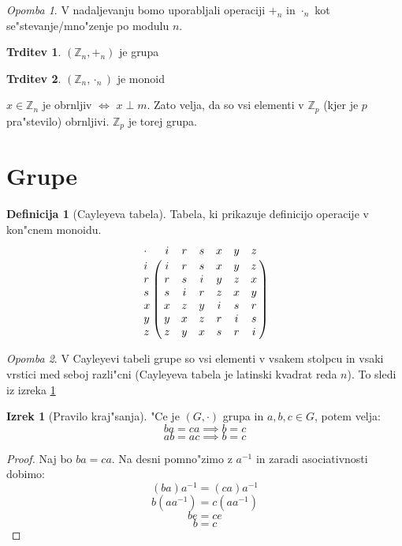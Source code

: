 \documentclass{article}
\theoremstyle{definition}
\newtheorem{definition}{Definicija}[section]
\newtheorem{claim}{Trditev}[section]
\newtheorem{theorem}{Izrek}[section]
\theoremstyle{remark}
\newtheorem*{rem}{Opomba}
\newcommand{\Z}{\mathbb{Z}}
\let\bbordermatrix\bordermatrix
\begin{document}
	\begin{rem}
		V nadaljevanju bomo uporabljali operaciji $+_{n}$ in $\cdot_{n}$ kot se"stevanje/mno"zenje po modulu $n$.
	\end{rem}
	
	\begin{claim}
		$(\Z_n, +_n)$ je grupa
	\end{claim}
	\begin{claim}
		$(\Z_n, \cdot_n)$ je monoid
	\end{claim}
	$x \in \Z_n$ je obrnljiv $\iff$ $x \perp m$. Zato velja, da so vsi elementi v $\Z_p$ (kjer je $p$ pra"stevilo) obrnljivi. $\Z_p$ je torej grupa.
	
	\section{Grupe}
	\begin{definition}[Cayleyeva tabela]
		Tabela, ki prikazuje definicijo operacije v kon"cnem monoidu.
		$$
		\bbordermatrix{
			\cdot & i & r & s & x & y & z \cr
				i & i & r & s & x & y & z \cr
				r & r & s & i & y & z & x \cr
				s & s & i & r & z & x & y \cr
				x & x & z & y & i & s & r \cr
				y & y & x & z & r & i & s \cr
				z & z & y & x & s & r & i \cr
		}
		$$
	\end{definition}
	\begin{rem}
		V Cayleyevi tabeli grupe so vsi elementi v vsakem stolpcu in vsaki vrstici med seboj razli"cni (Cayleyeva tabela je latinski kvadrat reda $n$). To sledi iz izreka \ref{praviloKrajsanja}
	\end{rem}
	\begin{theorem}[Pravilo kraj"sanja]\label{praviloKrajsanja}
		"Ce je $(G, \cdot)$ grupa in $a, b, c \in G$, potem velja:
		\[ ba = ca \implies b = c \]
		\[ ab = ac \implies b = c \]
	\end{theorem}
	\begin{proof}
		Naj bo $ba = ca$. Na desni pomno"zimo z $a^{-1}$ in zaradi asociativnosti dobimo:
		\[ (ba)a^{-1} = (ca)a^{-1} \]
		\[ b(aa^{-1}) = c(aa^{-1}) \]
		\[ be = ce \]
		\[ b = c \]
	\end{proof}
\end{document}
